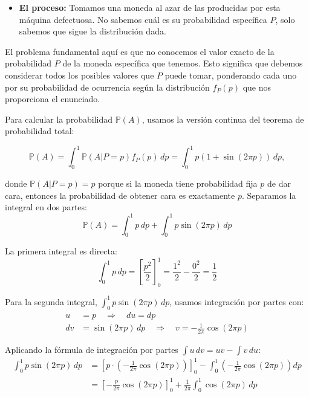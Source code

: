 \documentclass[
  11pt,
  letterpaper,
   addpoints,
  answers
  ]{exam}
\begin{document}
\begin{questions}
\begin{solution}
\begin{itemize}
\item \textbf{El proceso:} Tomamos una moneda al azar de las producidas por esta máquina defectuosa. No sabemos cuál es su probabilidad específica $P$, solo sabemos que sigue la distribución dada.
\end{itemize}

El problema fundamental aquí es que no conocemos el valor exacto de la probabilidad $P$ de la moneda específica que tenemos. Esto significa que debemos considerar todos los posibles valores que $P$ puede tomar, ponderando cada uno por su probabilidad de ocurrencia según la distribución $f_P(p)$ que nos proporciona el enunciado.

Para calcular la probabilidad $\mathbb{P}(A)$, usamos la versión continua del teorema de probabilidad total:

\begin{equation}
\mathbb{P}(A) = \int_0^1 \mathbb{P}(A | P = p)f_P(p) \, dp = \int_0^1 p(1 + \sin(2\pi p)) \, dp,
\end{equation}

donde $\mathbb{P}(A | P = p) = p$ porque si la moneda tiene probabilidad fija $p$ de dar cara, entonces la probabilidad de obtener cara es exactamente $p$. Separamos la integral en dos partes:
\begin{equation}
\mathbb{P}(A) = \int_0^1 p \, dp + \int_0^1 p \sin(2\pi p) \, dp
\end{equation}

La primera integral es directa:
\begin{equation}
\int_0^1 p \, dp = \left[\frac{p^2}{2}\right]_0^1 = \frac{1^2}{2} - \frac{0^2}{2} = \frac{1}{2}
\end{equation}


Para la segunda integral, $\int_0^1 p \sin(2\pi p) \, dp$, usamos integración por partes con:
\begin{align}
u &= p \quad \Rightarrow \quad du = dp \\
dv &= \sin(2\pi p) \, dp \quad \Rightarrow \quad v = -\frac{1}{2\pi}\cos(2\pi p)
\end{align}

Aplicando la fórmula de integración por partes $\int u \, dv = uv - \int v \, du$:
\begin{align}
\int_0^1 p \sin(2\pi p) \, dp &= \left[p \cdot \left(-\frac{1}{2\pi}\cos(2\pi p)\right)\right]_0^1 - \int_0^1 \left(-\frac{1}{2\pi}\cos(2\pi p)\right) dp \\
&= \left[-\frac{p}{2\pi}\cos(2\pi p)\right]_0^1 + \frac{1}{2\pi}\int_0^1 \cos(2\pi p) \, dp
\end{align}


\end{solution}
\end{questions}
\end{document}
